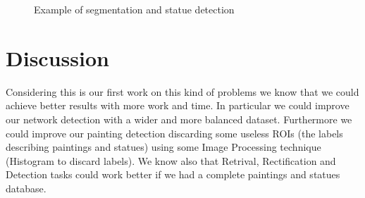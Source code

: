 \documentclass[10pt,twocolumn,letterpaper]{article}
\begin{document}
\begin{figure}
    \centering
    \caption{Example of segmentation and statue detection}
    \label{fig:results2}
\end{figure}

\section{Discussion}

Considering this is our first work on this kind of problems we know that we could achieve better results with more work and time.
In particular we could improve our network detection with a wider and more balanced dataset.
Furthermore we could improve our painting detection discarding some useless ROIs (\eg the labels describing paintings and statues) using some Image Processing technique (\eg Histogram to discard labels).
We know also that Retrival, Rectification and Detection tasks could work better if we had a complete paintings and statues database.

{\small


}
\end{document}
